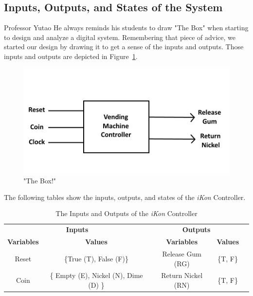 \documentclass{article}
\begin{document}
\subsection{Inputs, Outputs, and States of the System}
Professor Yutao He always reminds his students to draw "The Box" when starting 
to design and analyze a digital system. Remembering that piece of advice, we 
started our design by drawing it to get a sense of the inputs and outputs. 
Those inputs and outputs are depicted in Figure~\ref{fig:box}. \\

\clearpage

\begin{figure}[h!]
\centering
\includegraphics[scale=0.7]{Box}
\caption{"The Box!"}
\label{fig:box}
\end{figure}

The following tables show the inputs, outputs, and states of the \textit{iKon} 
Controller.

\begin{table}[h]
\begin{center}
\begin{tabular}{|c|c|c|c|l}
\cline{1-4}
\multicolumn{2}{|c|}{ \textbf{Inputs} } & 
\multicolumn{2}{c|}{ \textbf{Outputs} } &  \\ \cline{1-4}
  \textbf{Variables} & \textbf{Values} & \textbf{Variables} & \textbf{Values} &
  \\ \cline{1-4}
  Reset & \{True (T), False (F)\} & Release Gum (RG) & \{T, F\} &  \\
  Coin & \{ Empty (E), Nickel (N), Dime (D) \} & Return Nickel (RN) & \{T, F\} 
  &  \\ \cline{1-4}
\end{tabular}
\caption{The Inputs and Outputs of the \textit{iKon} Controller}
\end{center}
\end{table}
\end{document}
